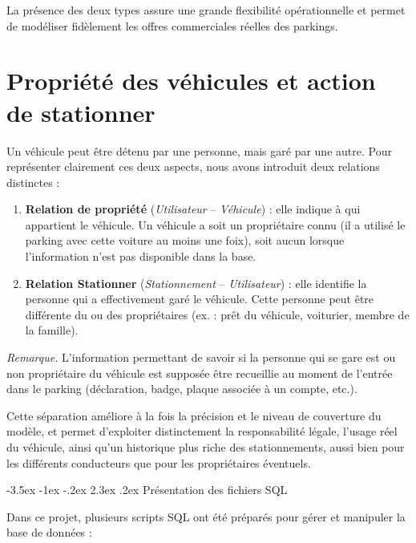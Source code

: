 \documentclass[a4paper,12pt]{report}
\makeatletter
\def\chapter{\@startsection {chapter}{0}{\z@}
                                   {-3.5ex \@plus -1ex \@minus -.2ex}
                                   {2.3ex \@plus.2ex}
                                   {\normalfont\huge\bfseries}}
\makeatother
\begin{document}
La présence des deux types assure une grande flexibilité opérationnelle et permet de 
modéliser fidèlement les offres commerciales réelles des parkings.

\section{Propriété des véhicules et action de stationner}

Un véhicule peut être détenu par une personne, mais garé par une autre. Pour représenter clairement ces deux aspects, nous avons introduit deux relations distinctes :

\begin{enumerate}
    \item \textbf{Relation de propriété} (\textit{Utilisateur} -- \textit{Véhicule}) : 
    elle indique à qui appartient le véhicule. Un véhicule a soit un propriétaire connu (il a utilisé le parking avec cette voiture au moins une foix), soit aucun lorsque l’information n’est pas disponible dans la base.

    \item \textbf{Relation Stationner} (\textit{Stationnement} -- \textit{Utilisateur}) : 
    elle identifie la personne qui a effectivement garé le véhicule. Cette personne peut être différente du ou des propriétaires (ex. : prêt du véhicule, voiturier, membre de la famille).
\end{enumerate}

\noindent\textit{Remarque.}  
L’information permettant de savoir si la personne qui se gare est ou non propriétaire du véhicule est supposée être recueillie au moment de l’entrée dans le parking (déclaration, badge, plaque associée à un compte, etc.).

\noindent Cette séparation améliore à la fois la précision et le niveau de couverture du modèle, et permet d’exploiter distinctement la responsabilité légale, l’usage réel du véhicule, ainsi qu’un historique plus riche des stationnements, aussi bien pour les différents conducteurs que pour les propriétaires éventuels.


\chapter{Présentation des fichiers SQL}

Dans ce projet, plusieurs scripts SQL ont été préparés pour gérer et manipuler la base de données :
\end{document}
